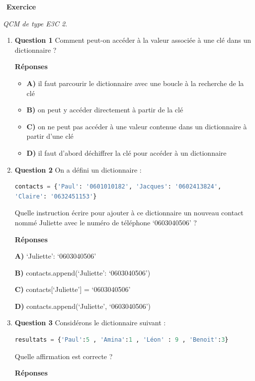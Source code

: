 \documentclass[
  11pt,
]{article}
\newcounter{exo}
\newenvironment{exercice}[1]
{\par \medskip   \addtocounter{exo}{1} \noindent  
\begin{bclogo}[arrondi =0.1,   noborder = true, logo=\bccrayon, marge=4]{~\textbf{Exercice} \textbf{\theexo} {\itshape #1} }  \par}
{
\end{bclogo}
 \par \bigskip }
\newcounter{def}
\begin{document}
\begin{exercice}{}

\emph{QCM de type E3C 2}.

\begin{enumerate}
\def\labelenumi{\arabic{enumi}.}
\item
  \textbf{Question 1} Comment peut-on accéder à la valeur associée à une
  clé dans un dictionnaire ?

  \textbf{Réponses}

  \begin{itemize}
  \item
    \textbf{A)} il faut parcourir le dictionnaire avec une boucle à la
    recherche de la clé
  \item
    \textbf{B)} on peut y accéder directement à partir de la clé
  \item
    \textbf{C)} on ne peut pas accéder à une valeur contenue dans un
    dictionnaire à partir d'une clé
  \item
    \textbf{D)} il faut d'abord déchiffrer la clé pour accéder à un
    dictionnaire
  \end{itemize}
\item
  \textbf{Question 2} On a défini un dictionnaire :

\begin{lstlisting}[language=Python]
contacts = {'Paul': '0601010182', 'Jacques': '0602413824',
'Claire': '0632451153'}
\end{lstlisting}

  Quelle instruction écrire pour ajouter à ce dictionnaire un nouveau
  contact nommé Juliette avec le numéro de téléphone `0603040506' ?

  \textbf{Réponses}

  \textbf{A)} `Juliette': `0603040506'

  \textbf{B)} contacts.append(`Juliette': `0603040506')

  \textbf{C)} contacts{[}`Juliette'{]} = `0603040506'

  \textbf{D)} contacts.append(`Juliette', `0603040506')
\item
  \textbf{Question 3} Considérons le dictionnaire suivant :

\begin{lstlisting}[language=Python]
resultats = {'Paul':5 , 'Amina':1 , 'Léon' : 9 , 'Benoit':3}
\end{lstlisting}

  Quelle affirmation est correcte ?

  \textbf{Réponses}


\end{enumerate}
\end{exercice}
\end{document}
